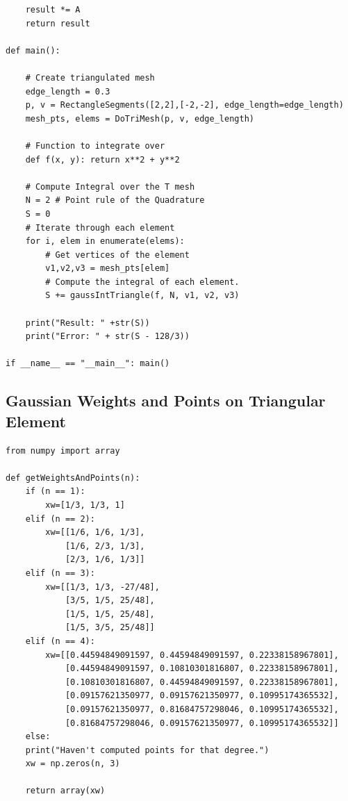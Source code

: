 \documentclass{uonmathreport}
\begin{document}
\begin{verbatim}
	result *= A		
	return result

def main():

	# Create triangulated mesh
	edge_length = 0.3
	p, v = RectangleSegments([2,2],[-2,-2], edge_length=edge_length)
	mesh_pts, elems = DoTriMesh(p, v, edge_length)
	
	# Function to integrate over 
	def f(x, y): return x**2 + y**2
	
	# Compute Integral over the T mesh
	N = 2 # Point rule of the Quadrature
	S = 0
	# Iterate through each element
	for i, elem in enumerate(elems):
		# Get vertices of the element
		v1,v2,v3 = mesh_pts[elem]
		# Compute the integral of each element.
		S += gaussIntTriangle(f, N, v1, v2, v3)
		
	print("Result: " +str(S))
	print("Error: " + str(S - 128/3))

if __name__ == "__main__": main()
\end{verbatim}
\subsection{Gaussian Weights and Points on Triangular Element} \label{app:gauss_ws_and_ps}
\begin{verbatim}
from numpy import array

def getWeightsAndPoints(n):
	if (n == 1):
		xw=[1/3, 1/3, 1]
	elif (n == 2):
		xw=[[1/6, 1/6, 1/3],
			[1/6, 2/3, 1/3], 
			[2/3, 1/6, 1/3]]
	elif (n == 3):
		xw=[[1/3, 1/3, -27/48],
			[3/5, 1/5, 25/48],
			[1/5, 1/5, 25/48],
			[1/5, 3/5, 25/48]]
	elif (n == 4):
		xw=[[0.44594849091597, 0.44594849091597, 0.22338158967801],
			[0.44594849091597, 0.10810301816807, 0.22338158967801],
			[0.10810301816807, 0.44594849091597, 0.22338158967801], 
			[0.09157621350977, 0.09157621350977, 0.10995174365532], 
			[0.09157621350977, 0.81684757298046, 0.10995174365532], 
			[0.81684757298046, 0.09157621350977, 0.10995174365532]]
	else:
	print("Haven't computed points for that degree.")
	xw = np.zeros(n, 3)
	
	return array(xw)
	
\end{verbatim}

\newpage

\end{document}
